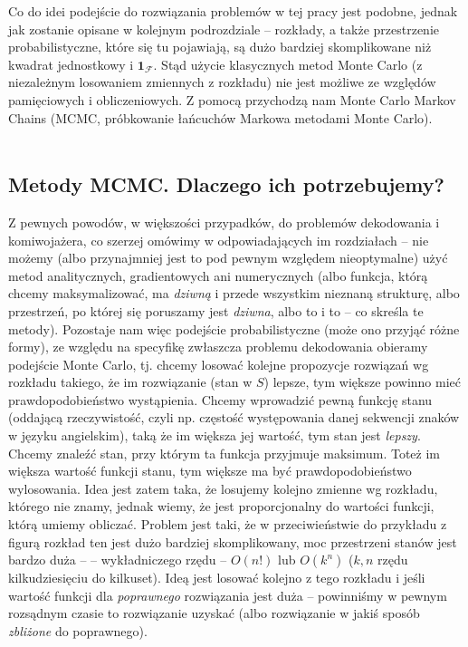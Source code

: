 \documentclass[a4paper]{article}
\theoremstyle{defn}
\theoremstyle{theorem}
\theoremstyle{lemma}
\theoremstyle{cor}
\theoremstyle{fact}
\begin{document}
Co do idei podejście do rozwiązania problemów w tej pracy jest podobne, jednak jak zostanie opisane w kolejnym podrozdziale – rozkłady, a także przestrzenie probabilistyczne, które się tu pojawiają, są dużo bardziej skomplikowane niż kwadrat jednostkowy i $\mathbf{1}_{\mathcal{F}}$. Stąd użycie klasycznych metod Monte Carlo (z niezależnym losowaniem zmiennych z rozkładu) nie jest możliwe ze względów pamięciowych i obliczeniowych. Z pomocą przychodzą nam Monte Carlo Markov Chains (MCMC, próbkowanie łańcuchów Markowa metodami Monte Carlo).
\\\\
\subsection{Metody MCMC. Dlaczego ich potrzebujemy?}
Z pewnych powodów, w większości przypadków, do problemów dekodowania i komiwojażera, co szerzej omówimy w odpowiadających im rozdziałach – nie możemy (albo przynajmniej jest to pod pewnym względem nieoptymalne) użyć metod analitycznych, gradientowych ani numerycznych (albo funkcja, którą chcemy maksymalizować, ma \textit{dziwną} i przede wszystkim nieznaną strukturę, albo przestrzeń, po której się poruszamy jest \textit{dziwna}, albo to i to – co skreśla te metody). Pozostaje nam więc podejście probabilistyczne (może ono przyjąć różne formy), ze względu na specyfikę zwłaszcza problemu dekodowania obieramy podejście Monte Carlo, tj. chcemy losować kolejne propozycje rozwiązań wg rozkładu takiego, że im rozwiązanie (stan w $S$) lepsze, tym większe powinno mieć prawdopodobieństwo wystąpienia.
Chcemy wprowadzić pewną funkcję stanu (oddającą rzeczywistość, czyli np. częstość występowania danej sekwencji znaków w języku angielskim), taką że im większa jej wartość, tym stan jest \textit{lepszy}. Chcemy znaleźć stan, przy którym ta funkcja przyjmuje maksimum. Toteż im większa wartość funkcji stanu, tym większe ma być prawdopodobieństwo wylosowania. Idea jest zatem taka, że losujemy kolejno zmienne wg rozkładu, którego nie znamy, jednak wiemy, że jest proporcjonalny do wartości funkcji, którą umiemy obliczać. Problem jest taki, że w przeciwieństwie do przykładu z figurą rozkład ten jest dużo bardziej skomplikowany, moc przestrzeni stanów jest bardzo duża – – wykładniczego rzędu – $O(n!)$ lub $O(k^n)$ ($k, n$ rzędu kilkudziesięciu do kilkuset). Ideą jest losować kolejno z tego rozkładu i jeśli wartość funkcji dla \textit{poprawnego} rozwiązania jest duża – powinniśmy w pewnym rozsądnym czasie to rozwiązanie uzyskać (albo rozwiązanie w jakiś sposób \textit{zbliżone} do poprawnego).
\end{document}
